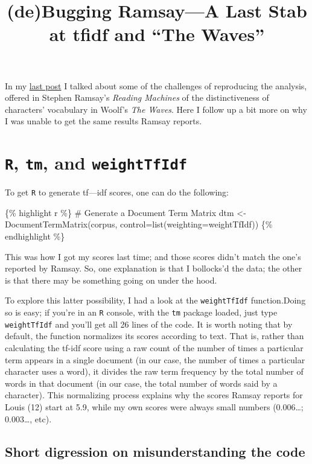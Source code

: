 \documentclass[
  12pt,
]{article}
\title{(de)Bugging Ramsay---A Last Stab at tfidf and ``The Waves''}
\author{}
\date{}
\begin{document}
In my
\href{http://cforster.com/2013/02/reading-the-waves-with-stephen-ramsay/}{last
post} I talked about some of the challenges of reproducing the analysis,
offered in Stephen Ramsay's \emph{Reading Machines} of the
distinctiveness of characters' vocabulary in Woolf's \emph{The Waves}.
Here I follow up a bit more on why I was unable to get the same results
Ramsay reports.

\hypertarget{r-tm-and-weighttfidf}{%
\section{\texorpdfstring{\texttt{R}, \texttt{tm}, and
\texttt{weightTfIdf}}{R, tm, and weightTfIdf}}\label{r-tm-and-weighttfidf}}

To get \texttt{R} to generate tf---idf scores, one can do the following:

\{\% highlight r \%\} \# Generate a Document Term Matrix dtm \textless-
DocumentTermMatrix(corpus, control=list(weighting=weightTfIdf)) \{\%
endhighlight \%\}

This was how I got my scores last time; and those scores didn't match
the one's reported by Ramsay. So, one explanation is that I bollocks'd
the data; the other is that there may be something going on under the
hood.

To explore this latter possibility, I had a look at the
\texttt{weightTfIdf} function.{Doing so is easy; if you're in an
\texttt{R} console, with the \texttt{tm} package loaded, just type
\texttt{weightTfIdf} and you'll get all 26 lines of the code.} It is
worth noting that by default, the function normalizes its scores
according to text. That is, rather than calculating the tf-idf score
using a raw count of the number of times a particular term appears in a
single document (in our case, the number of times a particular character
uses a word), it divides the raw term frequency by the total number of
words in that document (in our case, the total number of words said by a
character). This normalizing process explains why the scores Ramsay
reports for Louis (12) start at 5.9, while my own scores were always
small numbers (0.006\ldots; 0.003\ldots, etc).

\hypertarget{short-digression-on-misunderstanding-the-code}{%
\subsection{Short digression on misunderstanding the
code}\label{short-digression-on-misunderstanding-the-code}}
\end{document}
